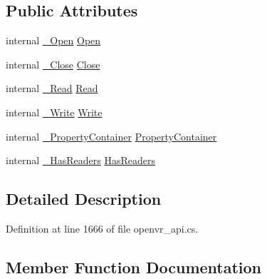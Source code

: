 \subsection*{Public Attributes}
\begin{DoxyCompactItemize}
\item 
internal \mbox{\hyperlink{struct_valve_1_1_v_r_1_1_i_v_r_i_o_buffer_a95ed10b524750552d8ae33a0ed369da2}{\+\_\+\+Open}} \mbox{\hyperlink{struct_valve_1_1_v_r_1_1_i_v_r_i_o_buffer_afa5dd11baf2340160cdd72fb38c4e384}{Open}}
\item 
internal \mbox{\hyperlink{struct_valve_1_1_v_r_1_1_i_v_r_i_o_buffer_a3c467ee9ea9833cef96b30c7dbbd933d}{\+\_\+\+Close}} \mbox{\hyperlink{struct_valve_1_1_v_r_1_1_i_v_r_i_o_buffer_a6e5984e04b851d1a0ec667f57435bfa6}{Close}}
\item 
internal \mbox{\hyperlink{struct_valve_1_1_v_r_1_1_i_v_r_i_o_buffer_ae347b94fa06c9a91e3f7bb3baa432c6a}{\+\_\+\+Read}} \mbox{\hyperlink{struct_valve_1_1_v_r_1_1_i_v_r_i_o_buffer_a8cc96fd2f132261d368e4169394cbcc3}{Read}}
\item 
internal \mbox{\hyperlink{struct_valve_1_1_v_r_1_1_i_v_r_i_o_buffer_a54b193825077c30de700adf41e81b975}{\+\_\+\+Write}} \mbox{\hyperlink{struct_valve_1_1_v_r_1_1_i_v_r_i_o_buffer_aa8e58f602438f05b2dc53bd3622320d4}{Write}}
\item 
internal \mbox{\hyperlink{struct_valve_1_1_v_r_1_1_i_v_r_i_o_buffer_abbf839546716805d584e6cba3040013a}{\+\_\+\+Property\+Container}} \mbox{\hyperlink{struct_valve_1_1_v_r_1_1_i_v_r_i_o_buffer_a29bd68b3897ea39ee4bc7a8510c58a4e}{Property\+Container}}
\item 
internal \mbox{\hyperlink{struct_valve_1_1_v_r_1_1_i_v_r_i_o_buffer_a6a33628dafbef18c06553fe1ba31e8cc}{\+\_\+\+Has\+Readers}} \mbox{\hyperlink{struct_valve_1_1_v_r_1_1_i_v_r_i_o_buffer_ad81daaba6ab6af0d8c4b67d9349170b3}{Has\+Readers}}
\end{DoxyCompactItemize}


\subsection{Detailed Description}


Definition at line 1666 of file openvr\+\_\+api.\+cs.



\subsection{Member Function Documentation}
\mbox{\label{struct_valve_1_1_v_r_1_1_i_v_r_i_o_buffer_a3c467ee9ea9833cef96b30c7dbbd933d}} 

